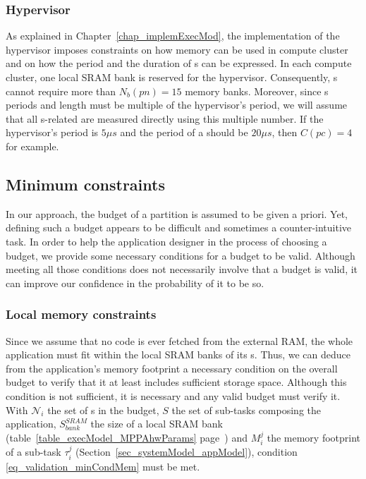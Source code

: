 \documentclass[main.tex]{subfiles}
\begin{document}
\subsubsection{Hypervisor}
As explained in Chapter~\ref{chap_implemExecMod}, the implementation of the
hypervisor imposes constraints on how memory can be used in compute cluster and
on how the period and the duration of \PC{}s can be expressed. In each compute
cluster, one local SRAM bank is reserved for the hypervisor. Consequently,
\PN{}s cannot require more than $N_b(pn) = 15$ memory banks. Moreover, since
\PC{}s periods and length must be multiple of the hypervisor's period, we will
assume that all \PC{}s-related are measured directly using this multiple
number. If the hypervisor's period is $5\mu s$ and the period of a \PC{} should
be $20 \mu s$, then $C(pc) = 4$ for example.



\subsection{Minimum constraints}
In our approach, the budget of a partition is assumed to be given a priori.
Yet, defining such a budget appears to be difficult and sometimes a
counter-intuitive task. In order to help the application designer in the
process of choosing a budget, we provide some necessary conditions for a budget
to be valid. Although meeting all those conditions does not necessarily involve
that a budget is valid, it can improve our confidence in the probability of it
to be so.

\subsubsection{Local memory constraints}
Since we assume that no code is ever fetched from the external RAM, the whole
application must fit within the local SRAM banks of its \PN{}s. Thus, we can
deduce from the application's memory footprint a necessary condition on the
overall budget to verify that it at least includes sufficient storage space.
Although this condition is not sufficient, it is necessary and any valid budget
must verify it. With $\mathcal{N}_i$ the set of \PN{}s in the budget, $S$ the
set of sub-tasks composing the application, $S_{bank}^{SRAM}$ the size of a
local SRAM bank (table~\ref{table_execModel_MPPAhwParams}
page~\pageref{table_execModel_MPPAhwParams}) and $M_i^j$ the memory footprint
of a sub-task $\tau_i^j$ (Section~\ref{sec_systemModel_appModel}), condition
\ref{eq_validation_minCondMem} must be met.
\end{document}
